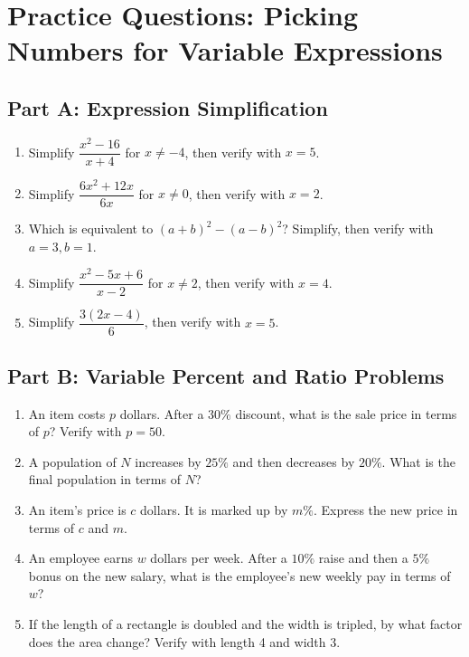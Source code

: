 \documentclass[14pt]{extarticle}
\begin{document}
\newpage

\section*{Practice Questions: Picking Numbers for Variable Expressions}

\subsection*{Part A: Expression Simplification}
\begin{enumerate}
  \item Simplify \(\dfrac{x^2 - 16}{x + 4}\) for \(x \neq -4\), then verify with \(x = 5\).
  \item Simplify \(\dfrac{6x^2 + 12x}{6x}\) for \(x \neq 0\), then verify with \(x = 2\).
  \item Which is equivalent to \((a + b)^2 - (a - b)^2\)? Simplify, then verify with \(a = 3, b = 1\).
  \item Simplify \(\dfrac{x^2 - 5x + 6}{x - 2}\) for \(x \neq 2\), then verify with \(x = 4\).
  \item Simplify \(\dfrac{3(2x - 4)}{6}\), then verify with \(x = 5\).
\end{enumerate}

\subsection*{Part B: Variable Percent and Ratio Problems}
\begin{enumerate}
  \item An item costs \(p\) dollars. After a \(30\%\) discount, what is the sale price in terms of \(p\)? Verify with \(p = 50\).
  \item A population of \(N\) increases by \(25\%\) and then decreases by \(20\%\). What is the final population in terms of \(N\)?
  \item An item's price is \(c\) dollars. It is marked up by \(m\%\). Express the new price in terms of \(c\) and \(m\).
  \item An employee earns \(w\) dollars per week. After a \(10\%\) raise and then a \(5\%\) bonus on the new salary, what is the employee's new weekly pay in terms of \(w\)?
  \item If the length of a rectangle is doubled and the width is tripled, by what factor does the area change? Verify with length 4 and width 3.
\end{enumerate}
\end{document}
